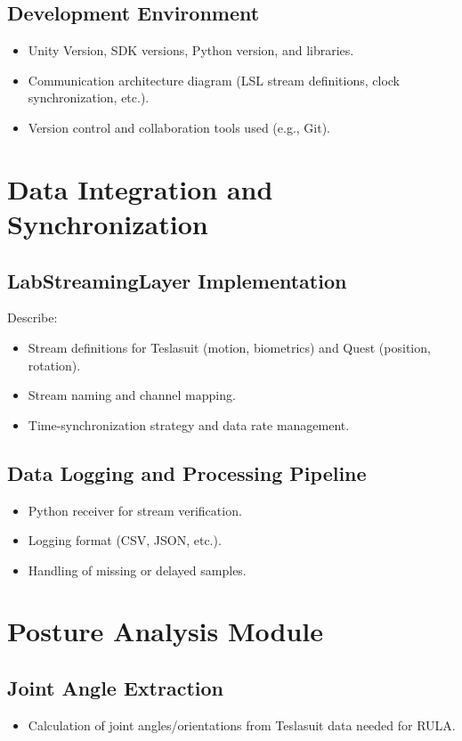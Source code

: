 \subsection{Development Environment}
\begin{itemize}
    \item Unity Version, SDK versions, Python version, and libraries.
    \item Communication architecture diagram (LSL stream definitions, clock synchronization, etc.).
    \item Version control and collaboration tools used (e.g., Git).
\end{itemize}

\section{Data Integration and Synchronization}
\subsection{LabStreamingLayer Implementation}
Describe:
\begin{itemize}
    \item Stream definitions for Teslasuit (motion, biometrics) and Quest (position, rotation).
    \item Stream naming and channel mapping.
    \item Time-synchronization strategy and data rate management.
\end{itemize}

\subsection{Data Logging and Processing Pipeline}
\begin{itemize}
    \item Python receiver for stream verification.
    \item Logging format (CSV, JSON, etc.).
    \item Handling of missing or delayed samples.
\end{itemize}

\section{Posture Analysis Module}
\subsection{Joint Angle Extraction}
\begin{itemize}
    \item Calculation of joint angles/orientations from Teslasuit data needed for RULA.
\end{itemize}

